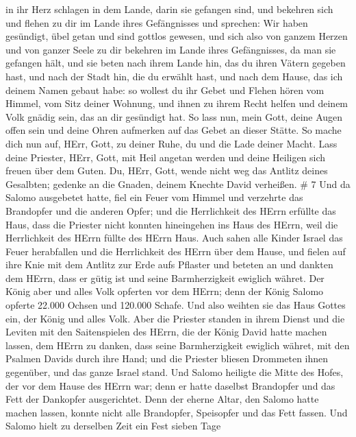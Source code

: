 in ihr Herz schlagen in dem Lande, darin sie gefangen sind, und bekehren
sich und flehen zu dir im Lande ihres Gefängnisses und sprechen: Wir
haben gesündigt, übel getan und sind gottlos gewesen,  und
sich also von ganzem Herzen und von ganzer Seele zu dir bekehren im
Lande ihres Gefängnisses, da man sie gefangen hält, und sie beten nach
ihrem Lande hin, das du ihren Vätern gegeben hast, und nach der Stadt
hin, die du erwählt hast, und nach dem Hause, das ich deinem Namen
gebaut habe:  so wollest du ihr Gebet und Flehen hören vom
Himmel, vom Sitz deiner Wohnung, und ihnen zu ihrem Recht helfen und
deinem Volk gnädig sein, das an dir gesündigt hat.  So lass
nun, mein Gott, deine Augen offen sein und deine Ohren aufmerken auf das
Gebet an dieser Stätte.  So mache dich nun auf, HErr, Gott,
zu deiner Ruhe, du und die Lade deiner Macht. Lass deine Priester, HErr,
Gott, mit Heil angetan werden und deine Heiligen sich freuen über dem
Guten.  Du, HErr, Gott, wende nicht weg das Antlitz deines
Gesalbten; gedenke an die Gnaden, deinem Knechte David verheißen. \# 7
 Und da Salomo ausgebetet hatte, fiel ein Feuer vom Himmel
und verzehrte das Brandopfer und die anderen Opfer; und die Herrlichkeit
des HErrn erfüllte das Haus,  dass die Priester nicht
konnten hineingehen ins Haus des HErrn, weil die Herrlichkeit des HErrn
füllte des HErrn Haus.  Auch sahen alle Kinder Israel das
Feuer herabfallen und die Herrlichkeit des HErrn über dem Hause, und
fielen auf ihre Knie mit dem Antlitz zur Erde aufs Pflaster und beteten
an und dankten dem HErrn, dass er gütig ist und seine Barmherzigkeit
ewiglich währet.  Der König aber und alles Volk opferten vor
dem HErrn;  denn der König Salomo opferte 22.000 Ochsen und
120.000 Schafe. Und also weihten sie das Haus Gottes ein, der König und
alles Volk.  Aber die Priester standen in ihrem Dienst und
die Leviten mit den Saitenspielen des HErrn, die der König David hatte
machen lassen, dem HErrn zu danken, dass seine Barmherzigkeit ewiglich
währet, mit den Psalmen Davids durch ihre Hand; und die Priester bliesen
Drommeten ihnen gegenüber, und das ganze Israel stand.  Und
Salomo heiligte die Mitte des Hofes, der vor dem Hause des HErrn war;
denn er hatte daselbst Brandopfer und das Fett der Dankopfer
ausgerichtet. Denn der eherne Altar, den Salomo hatte machen lassen,
konnte nicht alle Brandopfer, Speisopfer und das Fett fassen.
 Und Salomo hielt zu derselben Zeit ein Fest sieben Tage
